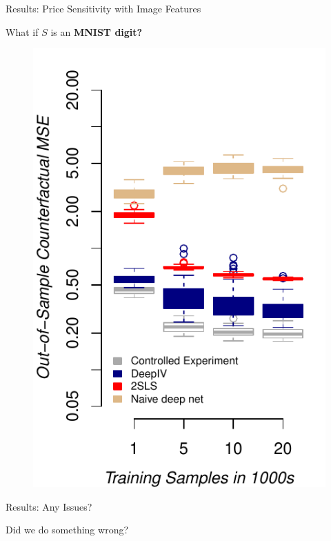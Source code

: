 \documentclass[xcolor={dvipsnames}]{beamer}
\begin{document}
\begin{frame}{Results: Price Sensitivity with Image Features}
\begin{minipage}[c]{0.5\textwidth}
        \end{minipage}\hspace{0.1cm}
        \begin{minipage}[c]{0.45\textwidth}
            What if $S$ is an \textbf{MNIST digit?}
            \begin{figure}
                \centering
                \includegraphics[width=\textwidth]{figures/image_experiment}
            \end{figure}
        \end{minipage}

    \end{frame}

    \begin{frame}{Results: Any Issues?}

        \begin{center}
            \huge Did we do something wrong?
        \end{center}

    \end{frame}
\end{document}

